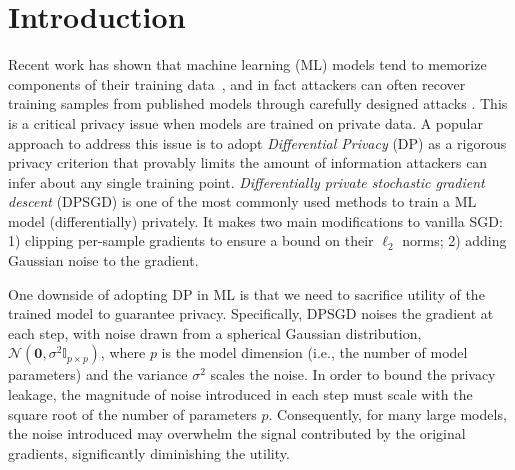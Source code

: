 \documentclass[11pt]{article}
\begin{document}
\section{Introduction}
Recent work has shown that machine learning (ML) models tend to memorize components of their training data~\cite{model-memorize-data}, and in fact attackers can often recover training samples from published models through carefully designed attacks \cite{extract-gpt2, membership-infer}.
This is a critical privacy issue when models are trained on private data. A popular approach to address this issue is to adopt 
\textit{Differential Privacy} (DP) \cite{dwork-dp} as a rigorous privacy criterion that provably limits the amount of information attackers can infer about any single training point. \textit{Differentially private stochastic gradient descent} (DPSGD) \cite{DP-SGD, dpsgd2, dpsgd3} is one of the most commonly used methods to train a ML model (differentially) privately. It makes two main modifications to vanilla SGD: 1) clipping per-sample gradients to ensure a bound on their $\ell_2$ norms; 2) adding Gaussian noise to the gradient.

One downside of adopting DP in ML is that we need to sacrifice utility of the trained model to guarantee privacy. Specifically, DPSGD noises the gradient at each step, with noise drawn from a spherical Gaussian distribution, $\mathcal{N}\left(\mathbf{0}, \sigma^{2} \mathbb{I}_{p\times p}\right)$, where $p$ is the model dimension (i.e., the number of model parameters) and the variance $\sigma^{2}$ scales the noise.
In order to bound the privacy leakage, the magnitude of noise introduced in each step must scale with the square root of the number of parameters $p$.
Consequently, for many large models, the noise introduced may overwhelm the signal contributed by the original gradients, significantly diminishing the utility.
\end{document}
